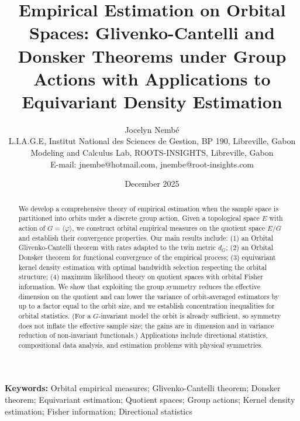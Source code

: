\documentclass[11pt]{article}
\begin{document}
\title{\textbf{Empirical Estimation on Orbital Spaces: Glivenko-Cantelli and Donsker Theorems under Group Actions with Applications to Equivariant Density Estimation}}

\author{Jocelyn Nemb\'e\\[0.5em]
\small L.I.A.G.E, Institut National des Sciences de Gestion, BP 190, Libreville, Gabon\\
\small Modeling and Calculus Lab, ROOTS-INSIGHTS, Libreville, Gabon\\
\small E-mail: jnembe@hotmail.com, jnembe@root-insights.com}

\date{December 2025}

\maketitle

\begin{abstract}
We develop a comprehensive theory of empirical estimation when the sample space is partitioned into orbits under a discrete group action. Given a topological space $E$ with action of $G = \langle\varphi\rangle$, we construct orbital empirical measures on the quotient space $E/G$ and establish their convergence properties. Our main results include: (1) an Orbital Glivenko-Cantelli theorem with rates adapted to the twin metric $d_G$; (2) an Orbital Donsker theorem for functional convergence of the empirical process; (3) equivariant kernel density estimation with optimal bandwidth selection respecting the orbital structure; (4) maximum likelihood theory on quotient spaces with orbital Fisher information. We show that exploiting the group symmetry reduces the effective dimension on the quotient and can lower the variance of orbit-averaged estimators by up to a factor equal to the orbit size, and we establish concentration inequalities for orbital statistics. (For a $G$-invariant model the orbit is already sufficient, so symmetry does not inflate the effective sample size; the gains are in dimension and in variance reduction of non-invariant functionals.) Applications include directional statistics, compositional data analysis, and estimation problems with physical symmetries.
\end{abstract}

\noindent\textbf{Keywords:} Orbital empirical measures; Glivenko-Cantelli theorem; Donsker theorem; Equivariant estimation; Quotient spaces; Group actions; Kernel density estimation; Fisher information; Directional statistics
\end{document}
